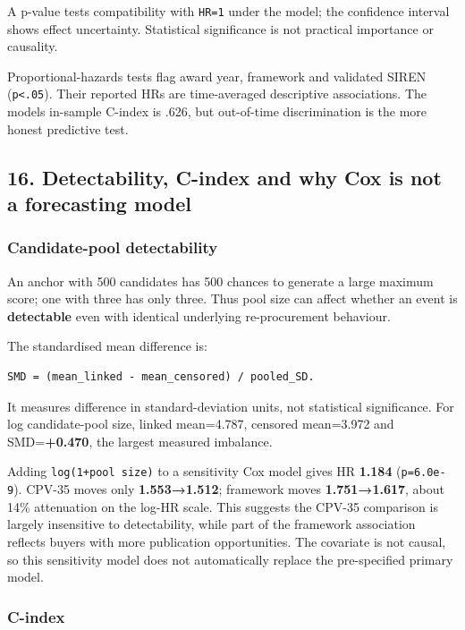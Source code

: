 A p-value tests compatibility with \texttt{HR=1} under the model; the
confidence interval shows effect uncertainty. Statistical significance
is not practical importance or causality.

Proportional-hazards tests flag award year, framework and validated
SIREN (\texttt{p\textless{}.05}). Their reported HRs are time-averaged
descriptive associations. The model\textquotesingle s in-sample C-index
is .626, but out-of-time discrimination is the more honest predictive
test.

\subsection{16. Detectability, C-index and why Cox is not a forecasting
model}\label{16-detectability-c-index-and-why-cox-is-not-a-forecasting-model}

\subsubsection{Candidate-pool
detectability}\label{candidate-pool-detectability}

An anchor with 500 candidates has 500 chances to generate a large
maximum score; one with three has only three. Thus pool size can affect
whether an event is \textbf{detectable} even with identical underlying
re-procurement behaviour.

The standardised mean difference is:

\begin{verbatim}
SMD = (mean_linked - mean_censored) / pooled_SD.
\end{verbatim}

It measures difference in standard-deviation units, not statistical
significance. For log candidate-pool size, linked mean=4.787, censored
mean=3.972 and SMD=\textbf{+0.470}, the largest measured imbalance.

Adding \texttt{log(1+pool\ size)} to a sensitivity Cox model gives HR
\textbf{1.184} (\texttt{p=6.0e-9}). CPV-35 moves only
\textbf{1.553→1.512}; framework moves \textbf{1.751→1.617}, about 14\%
attenuation on the log-HR scale. This suggests the CPV-35 comparison is
largely insensitive to detectability, while part of the framework
association reflects buyers with more publication opportunities. The
covariate is not causal, so this sensitivity model does not
automatically replace the pre-specified primary model.

\subsubsection{C-index}\label{c-index}

